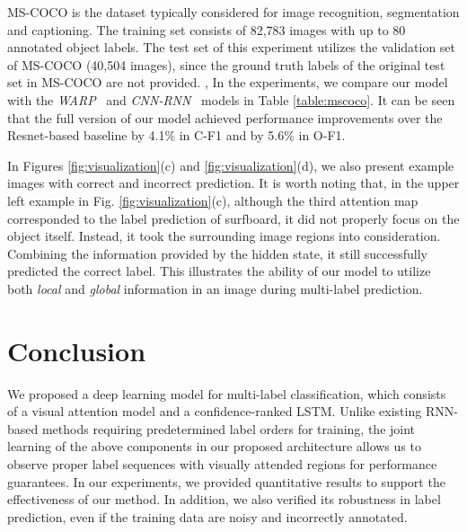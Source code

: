 \documentclass[letterpaper]{article} %
\begin{document}
MS-COCO is the dataset typically considered for image recognition, segmentation and captioning. The training set consists of 82,783 images with up to 80 annotated object labels. The test set of this experiment utilizes the validation set of MS-COCO (40,504 images), since the ground truth labels of the original test set in MS-COCO are not provided.
,
In the experiments, we compare our model with the \textit{WARP}~\cite{gong2013deep} and \textit{CNN-RNN}~\cite{wang2016cnn} models in Table \ref{table:mscoco}. It can be seen that the full version of our model achieved performance improvements over the Resnet-based baseline by 4.1\% in C-F1 and by 5.6\% in O-F1.

In Figures \ref{fig:visualization}(c) and \ref{fig:visualization}(d), we also present example images with correct and incorrect prediction. It is worth noting that, in the upper left example in Fig. \ref{fig:visualization}(c), although the third attention map corresponded to the label prediction of surfboard, it did not properly focus on the object itself. Instead, it took the surrounding image regions into consideration. Combining the information provided by the hidden state, it still successfully predicted the correct label. This illustrates the ability of our model to utilize both \emph{local} and \emph{global} information in an image during multi-label prediction.

\section{Conclusion}
We proposed a deep learning model for multi-label classification, which consists of a visual attention model and a confidence-ranked LSTM. Unlike existing RNN-based methods requiring predetermined label orders for training, the joint learning of the above components in our proposed architecture allows us to observe proper label sequences with visually attended regions for performance guarantees. In our experiments, we provided quantitative results to support the effectiveness of our method. In addition, we also verified its robustness in label prediction, even if the training data are noisy and incorrectly annotated.
\end{document}
